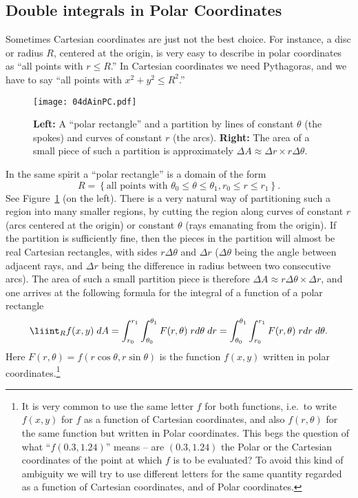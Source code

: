 \subsection{Double integrals in Polar Coordinates}  
\label{sec:04double-integrals-in-PC}
Sometimes Cartesian coordinates are just not the best choice. 
For instance, a disc or radius $R$, centered at the origin, is very
easy to describe in polar coordinates as ``all points with $r\le R$.''
In Cartesian coordinates we need Pythagoras, and we have to say
``all points with $x^2+y^2\le R^2$.''
\begin{figure}[ht]
  
  \qquad
  \texttt{[image: 04dAinPC.pdf]}
  \caption{\textbf{Left: } A ``polar rectangle'' and a partition by
  lines of constant $\theta$ (the spokes) and curves of constant $r$ (the arcs).
  \textbf{Right: } The area of a small piece of such a partition 
  is approximately $\Delta A \approx \Delta r\times
  r\Delta\theta$.}
  \label{fig:04dAinPC}
\end{figure}
In the same spirit a ``polar rectangle'' is a domain of the form
\[
R = \left\{ \text{all points with }
\theta_0 \le \theta \le \theta_1, r_0 \le r\le r_1
\right\}.
\]
See Figure~\ref{fig:04dAinPC} (on the left).  There is a very natural
way of partitioning such a region into many smaller regions, by
cutting the region along curves of constant $r$ (arcs centered at the
origin) or constant $\theta$ (rays emanating from the origin).
If the partition is sufficiently fine, then the pieces in the
partition will almost be real Cartesian rectangles, with sides
$r\Delta\theta$ and $\Delta r$ ($\Delta\theta$ being the angle between
adjacent rays, and $\Delta r$ being the difference in radius between two
consecutive arcs).  The area of such a small partition piece is
therefore $\Delta A \approx r\Delta\theta\times\Delta r$, and one
arrives at the following formula for the integral of a function of a
polar rectangle
\begin{equation}
  \liint_R f(x, y) \; dA
  =
  \int_{r_0}^{r_1} \int_{\theta_0}^{\theta_1}
  F(r, \theta)\; rd\theta\; dr
  =
  \int_{\theta_0}^{\theta_1} \int_{r_0}^{r_1}
  F(r, \theta)\; rdr\; d\theta.
  \label{eq:04integral-over-polar-rectangle}
\end{equation}
Here $F(r, \theta) = f(r\cos \theta, r\sin\theta)$ is the function
$f(x, y)$ written in polar coordinates.\footnote{It is very common to
use the same letter $f$ for both functions, i.e.\ to write $f(x,y)$
for $f$ as a function of Cartesian coordinates, and also $f(r,
\theta)$ for the same function but written in Polar coordinates.  This
begs the question of what ``$f(0.3, 1.24)$'' means -- are $(0.3, 1.24)$
the Polar or the Cartesian coordinates of the point at which $f$ is to be
evaluated?  To avoid this kind of ambiguity we will try to use different
letters for the same quantity regarded as a function of Cartesian
coordinates, and of Polar coordinates.}

